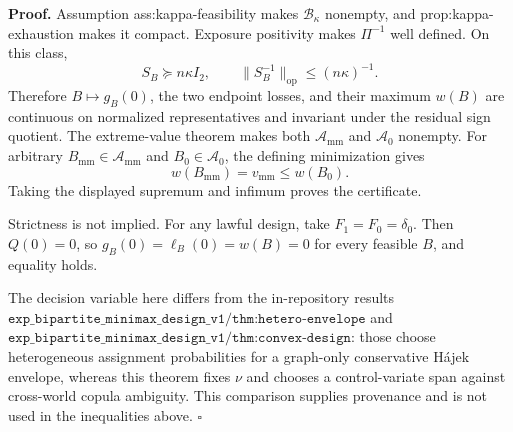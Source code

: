 \textbf{Proof.}
Assumption ass:kappa-feasibility makes \(\mathcal B_\kappa\) nonempty, and prop:kappa-exhaustion makes it compact.  Exposure positivity makes \(\Pi^{-1}\) well defined.  On this class,
\[
 S_B\succeq n\kappa I_2,
 \qquad \lVert S_B^{-1}\rVert_{\mathrm{op}}\le(n\kappa)^{-1}.
\]
Therefore \(B\mapsto g_B(0)\), the two endpoint losses, and their maximum \(w(B)\) are continuous on normalized representatives and invariant under the residual sign quotient.  The extreme-value theorem makes both \(\mathcal A_{\mathrm{mm}}\) and \(\mathcal A_0\) nonempty.  For arbitrary \(B_{\mathrm{mm}}\in\mathcal A_{\mathrm{mm}}\) and \(B_0\in\mathcal A_0\), the defining minimization gives
\[
 w(B_{\mathrm{mm}})=v_{\mathrm{mm}}\le w(B_0).
\]
Taking the displayed supremum and infimum proves the certificate.

Strictness is not implied.  For any lawful design, take \(F_1=F_0=\delta_0\).  Then \(Q(0)=0\), so \(g_B(0)=\ell_B(0)=w(B)=0\) for every feasible \(B\), and equality holds.

The decision variable here differs from the in-repository results \(\texttt{exp\_bipartite\_minimax\_design\_v1/thm:hetero-envelope}\) and \(\texttt{exp\_bipartite\_minimax\_design\_v1/thm:convex-design}\): those choose heterogeneous assignment probabilities for a graph-only conservative H\'ajek envelope, whereas this theorem fixes \(\nu\) and chooses a control-variate span against cross-world copula ambiguity.  This comparison supplies provenance and is not used in the inequalities above. \(\square\)